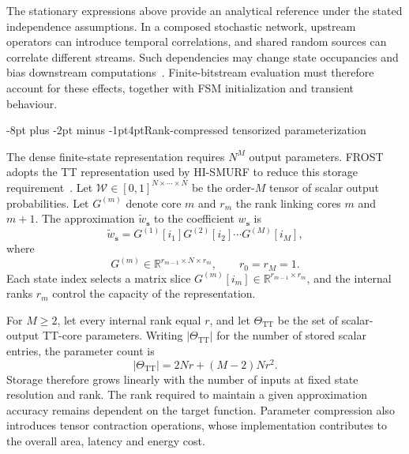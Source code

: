 \documentclass[pdflatex,sn-mathphys-num]{sn-jnl}
\makeatletter
\renewcommand\subsection{\@startsection{subsection}{2}{\z@}%
  {-8pt plus -2pt minus -1pt}{4pt}{\subsectionfont}}
\theoremstyle{thmstyleone}
\theoremstyle{thmstyletwo}
\theoremstyle{thmstylethree}
\makeatother
\begin{document}
The stationary expressions above provide an analytical reference under the stated independence assumptions. In a composed stochastic network, upstream operators can introduce temporal correlations, and shared random sources can correlate different streams. Such dependencies may change state occupancies and bias downstream computations~\cite{alaghi2013survey,alaghi2013correlation}. Finite-bitstream evaluation must therefore account for these effects, together with FSM initialization and transient behaviour.

\subsection{Rank-compressed tensorized parameterization}

The dense finite-state representation requires $N^M$ output parameters. FROST adopts the TT representation used by HI-SMURF to reduce this storage requirement~\cite{oseledets2011tensor,feng2026smurf}. Let $\mathcal{W}\in[0,1]^{N\times\cdots\times N}$ be the order-$M$ tensor of scalar output probabilities. Let $G^{(m)}$ denote core $m$ and $r_m$ the rank linking cores $m$ and $m+1$. The approximation $\widetilde{w}_{\boldsymbol{s}}$ to the coefficient $w_{\boldsymbol{s}}$ is
\begin{equation}
\widetilde{w}_{\boldsymbol{s}} = G^{(1)}[i_1] G^{(2)}[i_2] \cdots G^{(M)}[i_M], \label{eq:frost_tt_scalar}
\end{equation}
where
\begin{equation}
G^{(m)} \in \mathbb{R}^{r_{m-1}\times N\times r_m}, \qquad r_0=r_M=1.
\end{equation}
Each state index selects a matrix slice $G^{(m)}[i_m]\in\mathbb{R}^{r_{m-1}\times r_m}$, and the internal ranks $r_m$ control the capacity of the representation.

For $M\geq2$, let every internal rank equal $r$, and let $\Theta_{\mathrm{TT}}$ be the set of scalar-output TT-core parameters. Writing $|\Theta_{\mathrm{TT}}|$ for the number of stored scalar entries, the parameter count is
\begin{equation}
\left|\Theta_{\mathrm{TT}}\right| = 2Nr+(M-2)Nr^2. \label{eq:tt_scalar_parameters}
\end{equation}
Storage therefore grows linearly with the number of inputs at fixed state resolution and rank. The rank required to maintain a given approximation accuracy remains dependent on the target function. Parameter compression also introduces tensor contraction operations, whose implementation contributes to the overall area, latency and energy cost.
\end{document}
